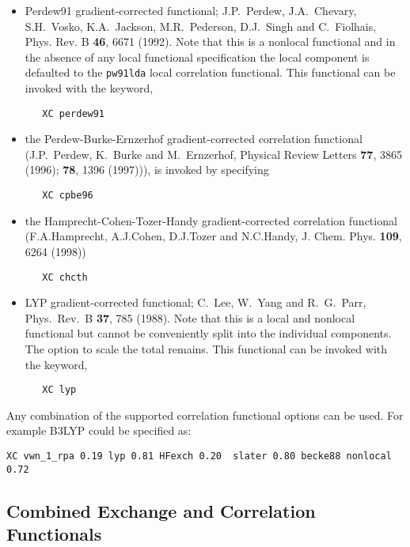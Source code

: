 \begin{itemize}
\item Perdew91 gradient-corrected functional;  J.P.~Perdew,
  J.A.~Chevary, S.H.~Vosko, K.A.~Jackson, M.R.~Pederson, D.J.~Singh
  and C.~Fiolhais, Phys. Rev. B {\bf 46}, 6671 (1992). Note that this
  is a nonlocal functional and in the absence of any local functional 
  specification the local component is defaulted to the \verb+pw91lda+ local 
  correlation functional.  This functional can be invoked with the keyword,
\begin{verbatim}
   XC perdew91
\end{verbatim}

\item the Perdew-Burke-Ernzerhof gradient-corrected correlation functional \\
 (J.P.~Perdew, K.~Burke and M.~Ernzerhof, Physical Review Letters
{\bf 77}, 3865 (1996); {\bf 78}, 1396 (1997))), is invoked by specifying

\begin{verbatim}
   XC cpbe96
\end{verbatim}

\item the Hamprecht-Cohen-Tozer-Handy  gradient-corrected correlation 
functional
(F.A.Hamprecht, A.J.Cohen, D.J.Tozer and N.C.Handy, 
    J. Chem. Phys. {\bf 109}, 6264 (1998))
\begin{verbatim}
   XC chcth
\end{verbatim}

\item LYP gradient-corrected functional; C.~Lee, W.~Yang and
   R.~G.~Parr, Phys.~Rev.~B {\bf 37}, 785 (1988).  Note that this
  is a local and nonlocal functional but cannot be conveniently split
  into the individual components.  The option to scale the total remains.
  This functional can be invoked with the keyword,
\begin{verbatim}
   XC lyp
\end{verbatim}

\end{itemize}

\fussy

Any combination of the supported correlation functional options can be
used.  For example  B3LYP could be specified as:
\begin{verbatim}
XC vwn_1_rpa 0.19 lyp 0.81 HFexch 0.20  slater 0.80 becke88 nonlocal 0.72
\end{verbatim}

  
\subsection{Combined Exchange and Correlation Functionals}

